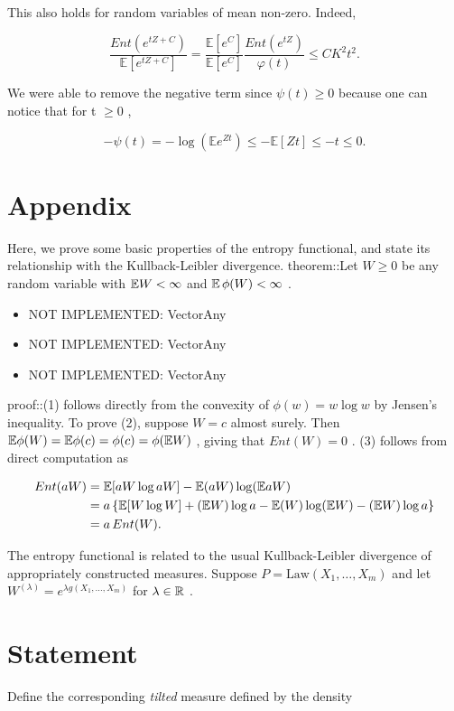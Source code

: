 \documentclass{article}
\begin{document}
This also holds for random variables of mean non-zero. Indeed,


\begin{equation*}
\frac{Ent(e^{tZ + C})}{\mathbb{E}[e^{tZ + C}]} = \frac{\mathbb{E}[e^C]}{\mathbb{E}[e^C]} \frac{Ent(e^{tZ})}{\varphi(t)} \leq CK^2t^2.
\end{equation*}

We were able to remove the negative term since  $\psi(t) \geq 0$  because one can notice that for t  $\geq 0$ ,


\begin{equation*}
-\psi(t) = -\log(\mathbb{E}e^{Zt}) \leq - \mathbb{E}[Zt] \leq -t \leq 0.
\end{equation*}



\section{Appendix}
\label{section:Appendix}
Here, we prove some basic properties of the entropy functional, and state its relationship with the Kullback-Leibler divergence. theorem::Let  $W\geq 0$  be any random variable with  $\mathbb{E} W < \infty$  and  $\mathbb{E}\, \phi(W)<\infty$ . 

\begin{itemize}
\item NOT IMPLEMENTED: Vector{Any}
\item NOT IMPLEMENTED: Vector{Any}
\item NOT IMPLEMENTED: Vector{Any}\end{itemize}
 proof::(1) follows directly from the convexity of  $\phi(w) = w \log w$  by Jensen's inequality. To prove (2), suppose  $W = c$  almost surely. Then  $\mathbb{E}\phi(W) = \mathbb{E} \phi(c) = \phi(c) = \phi(\mathbb{E} W)$ , giving that  $Ent(W)=0$ . (3) follows from direct computation as


\begin{align*}
Ent(aW) &= \mathbb{E}[aW \log aW] - \mathbb{E}(aW)\log (\mathbb{E} aW)\\
&= a\left\{ \mathbb{E}[W\log W] + (\mathbb{E} W)\log a - \mathbb{E}(W)\log (\mathbb{E} W) - (\mathbb{E} W)\log a \right\} \\
&= a\,Ent(W).
\end{align*}

 The entropy functional is related to the usual Kullback-Leibler divergence of appropriately constructed measures. Suppose  $P = \mathrm{Law}(X_1, \dots, X_m)$  and let  $W^{(\lambda)} = e^{\lambda g(X_1, \dots, X_m)}$  for  $\lambda \in \mathbb{R}$ . 
\section{Statement}
\label{section:Statement}
Define the corresponding  \textit{tilted}  measure defined by the density
\end{document}
